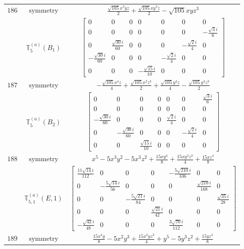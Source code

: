 \documentclass[fleqn,8pt,landscape]{jsarticle}
\begin{document}
\begin{longtable}{ccc}
$ 186 $ & $ \text{symmetry} $ & $ \frac{\sqrt{105} x^{3} y z}{2} + \frac{\sqrt{105} x y^{3} z}{2} - \sqrt{105} x y z^{3} $ \\
$  $ & $ \mathbb{T}_{5}^{(a)}(B_{1}) $ & $ \begin{bmatrix} 0 & 0 & 0 & 0 & 0 & 0 & 0 \\ 0 & 0 & 0 & 0 & 0 & 0 & - \frac{\sqrt{3} i}{6} \\ 0 & \frac{\sqrt{30} i}{60} & 0 & 0 & 0 & - \frac{\sqrt{2} i}{4} & 0 \\ - \frac{\sqrt{30} i}{60} & 0 & 0 & 0 & - \frac{\sqrt{2} i}{4} & 0 & 0 \\ 0 & 0 & 0 & - \frac{\sqrt{15} i}{10} & 0 & 0 & 0 \end{bmatrix} $ \\ \hline
$ 187 $ & $ \text{symmetry} $ & $ - \frac{\sqrt{105} x^{4} z}{4} + \frac{\sqrt{105} x^{2} z^{3}}{2} + \frac{\sqrt{105} y^{4} z}{4} - \frac{\sqrt{105} y^{2} z^{3}}{2} $ \\
$  $ & $ \mathbb{T}_{5}^{(a)}(B_{2}) $ & $ \begin{bmatrix} 0 & 0 & 0 & 0 & 0 & 0 & \frac{\sqrt{3} i}{6} \\ 0 & 0 & 0 & 0 & 0 & 0 & 0 \\ - \frac{\sqrt{30} i}{60} & 0 & 0 & 0 & \frac{\sqrt{2} i}{4} & 0 & 0 \\ 0 & - \frac{\sqrt{30} i}{60} & 0 & 0 & 0 & - \frac{\sqrt{2} i}{4} & 0 \\ 0 & 0 & \frac{\sqrt{15} i}{10} & 0 & 0 & 0 & 0 \end{bmatrix} $ \\ \hline
$ 188 $ & $ \text{symmetry} $ & $ x^{5} - 5 x^{3} y^{2} - 5 x^{3} z^{2} + \frac{15 x y^{4}}{8} + \frac{15 x y^{2} z^{2}}{4} + \frac{15 x z^{4}}{8} $ \\
$  $ & $ \mathbb{T}_{5,1}^{(a)}(E,1) $ & $ \begin{bmatrix} \frac{11 \sqrt{14} i}{112} & 0 & 0 & 0 & - \frac{5 \sqrt{210} i}{336} & 0 & 0 \\ 0 & - \frac{5 \sqrt{14} i}{56} & 0 & 0 & 0 & \frac{\sqrt{210} i}{168} & 0 \\ 0 & 0 & - \frac{5 \sqrt{21} i}{84} & 0 & 0 & 0 & \frac{\sqrt{35} i}{28} \\ 0 & 0 & 0 & \frac{\sqrt{21} i}{42} & 0 & 0 & 0 \\ - \frac{\sqrt{42} i}{48} & 0 & 0 & 0 & \frac{3 \sqrt{70} i}{112} & 0 & 0 \end{bmatrix} $ \\ \hline
$ 189 $ & $ \text{symmetry} $ & $ \frac{15 x^{4} y}{8} - 5 x^{2} y^{3} + \frac{15 x^{2} y z^{2}}{4} + y^{5} - 5 y^{3} z^{2} + \frac{15 y z^{4}}{8} $ \\

\end{longtable}
\end{document}
